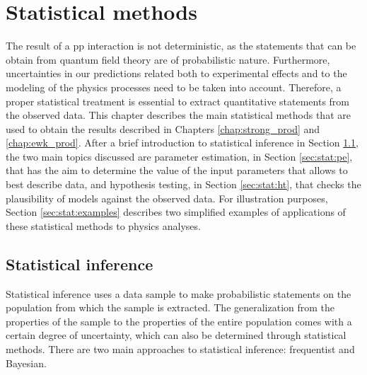 \chapter{Statistical methods}
\label{chap:stat}

The result of a \gls{pp} interaction is not deterministic, as the statements that can be obtain from quantum field theory are of probabilistic nature. 
Furthermore, uncertainties in our predictions related both to experimental effects and to the modeling of the physics processes need to be taken into account. 
Therefore, a proper statistical treatment is essential to extract quantitative statements from the observed data. 
This chapter describes the main statistical methods that are used to obtain the results described in Chapters \ref{chap:strong_prod} and  \ref{chap:ewk_prod}. After a brief introduction to statistical inference in Section \ref{sec:stat:intro}, the two main topics discussed are parameter estimation, in Section \ref{sec:stat:pe}, that has the aim to determine the value of the input parameters that allows to best describe data, and hypothesis testing, in Section \ref{sec:stat:ht}, that checks the plausibility of models against the observed data. 
For illustration purposes, Section \ref{sec:stat:examples} describes two simplified examples of applications of these statistical methods to physics analyses. 

\section{Statistical inference}
\label{sec:stat:intro}

Statistical inference uses a data sample to make probabilistic statements on the population from which the sample is extracted. The generalization from the properties of the sample to the properties of the entire population comes with a certain degree of uncertainty, which can also be determined  through statistical methods.
There are two main approaches to statistical inference: frequentist and Bayesian.

